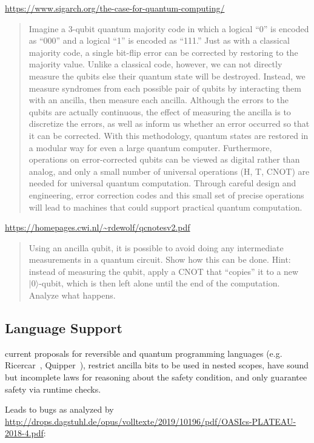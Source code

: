 \documentclass[sigplan,10pt,review,anonymous]{acmart}
\newcommand{\ket}[1]{|#1\rangle}
\begin{document}
\url{https://www.sigarch.org/the-case-for-quantum-computing/}
\begin{quote}
  Imagine a 3-qubit quantum majority code in which a logical “0” is
  encoded as “000” and a logical “1” is encoded as “111.”  Just as
  with a classical majority code, a single bit-flip error can be
  corrected by restoring to the majority value.  Unlike a classical
  code, however, we can not directly measure the qubits else their
  quantum state will be destroyed.  Instead, we measure syndromes from
  each possible pair of qubits by interacting them with an ancilla,
  then measure each ancilla.  Although the errors to the qubits are
  actually continuous, the effect of measuring the ancilla is to
  discretize the errors, as well as inform us whether an error
  occurred so that it can be corrected.  With this methodology,
  quantum states are restored in a modular way for even a large
  quantum computer.  Furthermore, operations on error-corrected qubits
  can be viewed as digital rather than analog, and only a small number
  of universal operations (H, T, CNOT) are needed for universal
  quantum computation.  Through careful design and engineering, error
  correction codes and this small set of precise operations will lead
  to machines that could support practical quantum computation.
\end{quote}

\url{https://homepages.cwi.nl/~rdewolf/qcnotesv2.pdf}
\begin{quote}
  Using an ancilla qubit, it is possible to avoid doing any
  intermediate measurements in a quantum circuit. Show how this can be
  done.  Hint: instead of measuring the qubit, apply a CNOT that
  “copies” it to a new $\ket{0}$-qubit, which is then left alone until
  the end of the computation. Analyze what happens.
\end{quote}

\subsection{Language Support}
 
current proposals for reversible
and quantum programming languages
(e.g. Ricercar~\cite{10.1007/978-3-319-20860-2_13},
Quipper~\cite{Green:2013:QSQ:2491956.2462177}), restrict ancilla bits
to be used in nested scopes, have sound but incomplete laws for
reasoning about the safety condition, and only guarantee safety via
runtime checks.

Leads to bugs as analyzed by
\url{http://drops.dagstuhl.de/opus/volltexte/2019/10196/pdf/OASIcs-PLATEAU-2018-4.pdf}:
\end{document}
